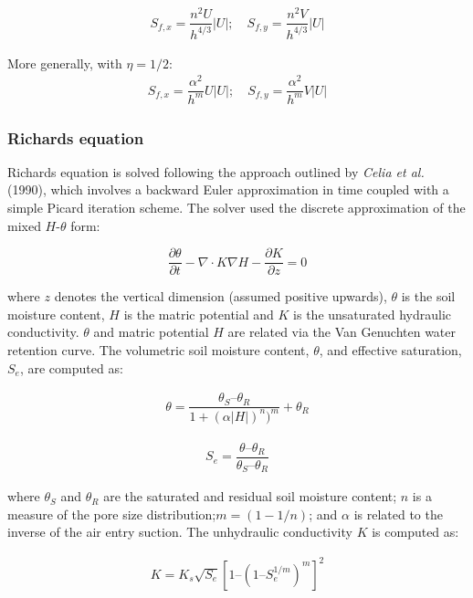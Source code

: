 \documentclass{article}
\begin{document}
\begin{eqnarray} \nonumber
S_{f,x} =  \dfrac{n^2 U}{h^{4/3}} |U|; \quad
S_{f,y} = \dfrac{n^2 V}{h^{4/3}} |U|
\end{eqnarray}

\noindent More generally, with $\eta=1/2$:
\begin{eqnarray} \nonumber
S_{f,x} = \dfrac{\alpha^2 }{h^m}  U |U|; \quad
S_{f,y} = \dfrac{\alpha^2 }{h^m} V |U|
\end{eqnarray}


\subsubsection*{Richards equation}

Richards equation is solved following the approach outlined by \textit{Celia et al.} (1990), which involves a backward Euler approximation in time coupled with a simple Picard iteration scheme.  
The solver used the discrete approximation of the  mixed $H$-$\theta$ form: 

\begin{equation} 
	\dfrac{\partial \theta}{\partial t} - \nabla \cdot K \nabla H - \dfrac{\partial K}{\partial z} = 0
\label{richards}
\end{equation}

\noindent where $z$ denotes the vertical dimension (assumed positive upwards),  $\theta$ is the soil moisture content, $H$ is the matric potential and $K$ is the unsaturated hydraulic conductivity.
 $\theta$ and matric potential $H$ are related via the Van Genuchten water retention curve. The volumetric soil moisture content, $\theta$, and effective saturation, $S_e$, are computed as:

\begin{eqnarray} \nonumber
\theta = \dfrac{\theta_S – \theta_R}{1 + (\alpha|H|)^n)^m} + \theta_R
\end{eqnarray}

\begin{eqnarray} \nonumber
S_e = \dfrac{\theta – \theta_R}{\theta_S – \theta_R}
\end{eqnarray}

 where $\theta_S$ and  $\theta_R$ are the saturated and residual soil moisture content; $n$ is a measure of the pore size distribution;$m=(1-1/n)$; and $\alpha$  is related to the inverse of the air entry suction.  The unhydraulic conductivity $K$ is computed as:

\begin{eqnarray} \nonumber
K = K_s \sqrt{S_e} [1 – (1 – S_e^{1/m})^m]^2
\end{eqnarray}
\end{document}
